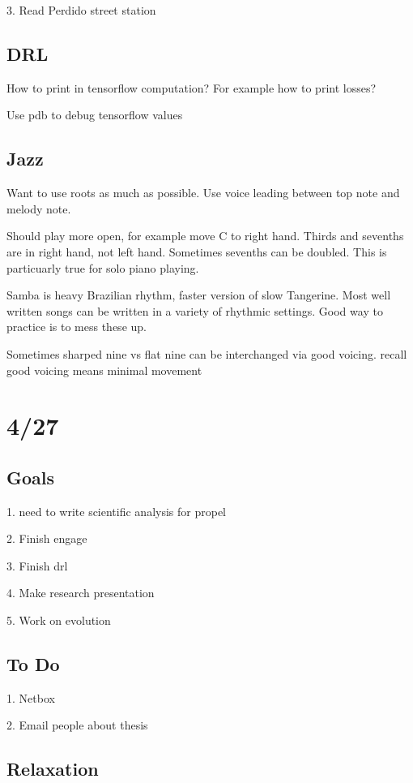 \documentclass[11pt]{article}
\theoremstyle{remark}
\begin{document}
3. Read Perdido street station

\subsection{DRL}

How to print in tensorflow computation? For example how to print losses?

Use pdb to debug tensorflow values

\subsection{Jazz}

Want to use roots as much as possible. Use voice leading between top note and melody note. 

Should play more open, for example move C to right hand. Thirds and sevenths are in right hand, not left hand. Sometimes sevenths can be doubled. This is particuarly true for solo piano playing.

Samba is heavy Brazilian rhythm, faster version of slow Tangerine. Most well written songs can be written in a variety of rhythmic settings. Good way to practice is to mess these up. 

Sometimes sharped nine vs flat nine can be interchanged via good voicing. recall good voicing means minimal movement

\section{4/27}

\subsection{Goals}

1. need to write scientific analysis for propel

2. Finish engage

3. Finish drl

4. Make research presentation

5. Work on evolution

\subsection{To Do}

1. Netbox

2. Email people about thesis

\subsection{Relaxation}
\end{document}
